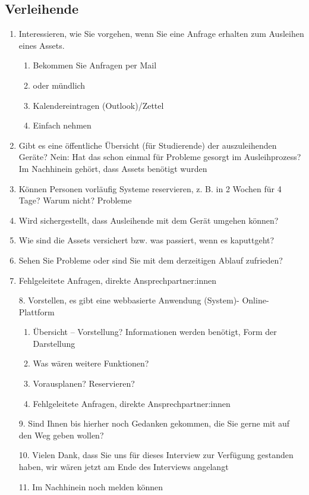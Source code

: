 \subsection{Verleihende}
{\sffamily\color{maincolor}{Abschnitt: Jetzt}}
\begin{enumerate}
    \item Interessieren, wie Sie vorgehen, wenn Sie eine Anfrage erhalten zum Ausleihen eines
          Assets.
          \begin{enumerate}
              \item Bekommen Sie Anfragen per Mail
              \item oder mündlich
              \item Kalendereintragen (Outlook)/Zettel
              \item Einfach nehmen
          \end{enumerate}
    \item Gibt es eine öffentliche Übersicht (für Studierende) der auszuleihenden Geräte? Nein: Hat
          das schon einmal für Probleme gesorgt im Ausleihprozess? Im Nachhinein gehört, dass Assets
          benötigt wurden
    \item Können Personen vorläufig Systeme reservieren, z. B. in 2 Wochen für 4 Tage?
          Warum nicht? Probleme
    \item Wird sichergestellt, dass Ausleihende mit dem Gerät umgehen können?
    \item Wie sind die Assets versichert bzw. was passiert, wenn es kaputtgeht?
    \item Sehen Sie Probleme oder sind Sie mit dem derzeitigen Ablauf zufrieden?
    \item Fehlgeleitete Anfragen, direkte Ansprechpartner:innen
\end{enumerate}

{\sffamily\color{maincolor}{Abschnitt: Visionen und Ziele}}
\begin{enumerate}
    \item[8.] Vorstellen, es gibt eine webbasierte Anwendung (System)- Online-Plattform
        \begin{enumerate}
            \item Übersicht – Vorstellung?
                  Informationen werden benötigt,
                  Form der Darstellung
            \item Was wären weitere Funktionen?
            \item Vorausplanen? Reservieren?
            \item Fehlgeleitete Anfragen, direkte Ansprechpartner:innen
        \end{enumerate}
    \item[9.] Sind Ihnen bis hierher noch Gedanken gekommen, die Sie gerne mit auf den Weg geben wollen?
    \item[10.] Vielen Dank, dass Sie uns für dieses Interview zur Verfügung gestanden haben, wir wären jetzt am Ende des Interviews angelangt
    \item[11.] Im Nachhinein noch melden können
\end{enumerate}

